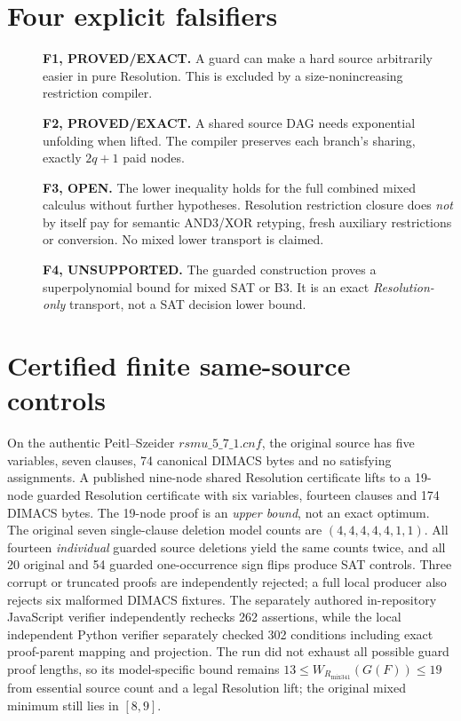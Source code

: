 \documentclass[11pt]{article}
\begin{document}
\section*{Four explicit falsifiers}
\begin{description}
\item[] \textbf{F1, PROVED/EXACT.} A guard can make a hard source arbitrarily easier in pure Resolution. This is excluded by a size-nonincreasing restriction compiler.
\item[] \textbf{F2, PROVED/EXACT.} A shared source DAG needs exponential unfolding when lifted. The compiler preserves each branch's sharing, exactly $2q+1$ paid nodes.
\item[] \textbf{F3, OPEN.} The lower inequality holds for the full combined mixed calculus without further hypotheses. Resolution restriction closure does \emph{not} by itself pay for semantic AND3/XOR retyping, fresh auxiliary restrictions or conversion. No mixed lower transport is claimed.
\item[] \textbf{F4, UNSUPPORTED.} The guarded construction proves a superpolynomial bound for mixed SAT or B3. It is an exact \emph{Resolution-only} transport, not a SAT decision lower bound.
\end{description}

\section*{Certified finite same-source controls}
On the authentic Peitl--Szeider $rsmu\_5\_7\_1.cnf$, the original source has five variables, seven clauses, 74 canonical DIMACS bytes and no satisfying assignments. A published nine-node shared Resolution certificate lifts to a 19-node guarded Resolution certificate with six variables, fourteen clauses and 174 DIMACS bytes. The 19-node proof is an \emph{upper bound}, not an exact optimum. The original seven single-clause deletion model counts are $(4,4,4,4,4,1,1)$. All fourteen \emph{individual} guarded source deletions yield the same counts twice, and all 20 original and 54 guarded one-occurrence sign flips produce SAT controls. Three corrupt or truncated proofs are independently rejected; a full local producer also rejects six malformed DIMACS fixtures. The separately authored in-repository JavaScript verifier independently rechecks 262 assertions, while the local independent Python verifier separately checked 302 conditions including exact proof-parent mapping and projection. The run did not exhaust all possible guard proof lengths, so its model-specific bound remains $13\le W_{R_{\mathrm{mix341}}}(G(F))\le19$ from essential source count and a legal Resolution lift; the original mixed minimum still lies in $[8,9]$.
\end{document}
